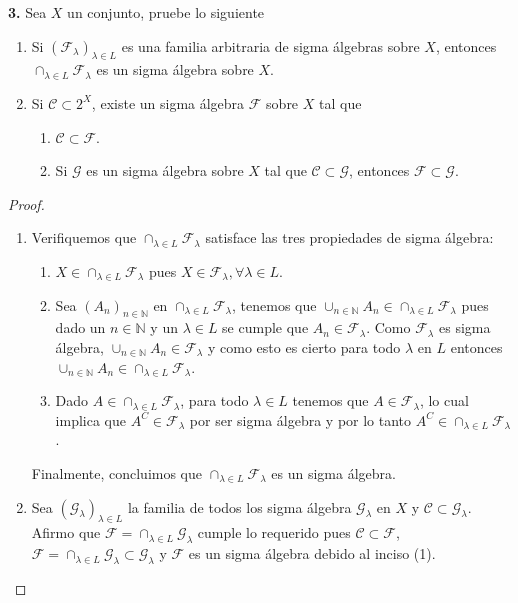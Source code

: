 \documentclass{article}
\newenvironment{statement}[1]{\smallskip\noindent\color[rgb]{1.00,0.00,0.50} {\bf #1.}}{}
\theoremstyle{definition}
\theoremstyle{remark}
\newcommand{\BN}{\mathbb N}
\begin{document}
\begin{statement}{3}
  Sea $X$ un conjunto, pruebe lo siguiente
  \begin{enumerate}
    \item Si $(\mathcal{F}_{\lambda})_{\lambda \in L}$ es una familia arbitraria de sigma \'algebras sobre $X$, entonces $\cap_{\lambda \in L} \mathcal{F}_{\lambda}$ es un sigma \'algebra sobre $X$.
    \item Si $\mathcal{C} \subset 2^X$, existe un sigma \'algebra $\mathcal{F}$ sobre $X$ tal que
      \begin{enumerate}
        \item $\mathcal{C} \subset \mathcal{F}$.
        \item Si $\mathcal{G}$ es un sigma \'algebra sobre $X$ tal que $\mathcal{C} \subset \mathcal{G}$, entonces $\mathcal{F} \subset \mathcal{G}$.
      \end{enumerate}
  \end{enumerate}
\end{statement}

\begin{proof}
  \begin{enumerate}
    \item Verifiquemos que $\cap_{\lambda \in L} \mathcal{F}_{\lambda}$ satisface las tres propiedades de sigma \'algebra:
      \begin{enumerate}
        \item $X \in \cap_{\lambda \in L} \mathcal{F}_{\lambda}$ pues $X \in \mathcal{F}_{\lambda}, \forall \lambda \in L$.
        \item Sea $(A_n)_{n \in \BN}$ en $\cap_{\lambda \in L} \mathcal{F}_{\lambda}$, tenemos que $\cup_{n \in \BN} A_n \in \cap_{\lambda \in L} \mathcal{F}_{\lambda}$ pues dado un $n \in \BN$ y un $\lambda \in L$ se cumple que $A_n \in \mathcal{F}_{\lambda}$. Como $\mathcal{F}_{\lambda}$ es sigma \'algebra, $\cup_{n \in \BN} A_n \in \mathcal{F}_{\lambda}$ y como esto es cierto para todo $\lambda$ en $L$ entonces $\cup_{n \in \BN} A_n \in \cap_{\lambda \in L} \mathcal{F}_{\lambda}$.
        \item Dado $A \in \cap_{\lambda \in L} \mathcal{F}_{\lambda}$, para todo $\lambda \in L$ tenemos que $A \in \mathcal{F}_{\lambda}$, lo cual implica que $A^C \in \mathcal{F}_{\lambda}$ por ser sigma \'algebra y por lo tanto $A^C \in \cap_{\lambda \in L} \mathcal{F}_{\lambda}$.
      \end{enumerate}
      Finalmente, concluimos que $\cap_{\lambda \in L} \mathcal{F}_{\lambda}$ es un sigma \'algebra.
    \item Sea $(\mathcal{G}_{\lambda})_{\lambda \in L}$ la familia de todos los sigma \'algebra $\mathcal{G}_{\lambda}$ en $X$ y $\mathcal{C} \subset \mathcal{G}_{\lambda}$. Afirmo que $\mathcal{F} = \cap_{\lambda \in L} \mathcal{G}_{\lambda}$ cumple lo requerido pues $\mathcal{C} \subset \mathcal{F}$, $\mathcal{F} = \cap_{\lambda \in L} \mathcal{G}_{\lambda} \subset \mathcal{G}_{\lambda}$ y $\mathcal{F}$ es un sigma \'algebra debido al inciso (1).
  \end{enumerate}
\end{proof}
\end{document}
